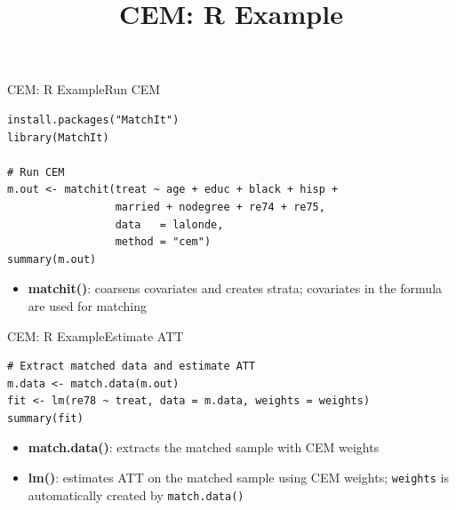 \documentclass[dvipsnames,hyperref={pdfpagelabels=false}]{beamer}
\begin{document}

\title[]
{CEM: R Example}

\author
{}

\institute{}

\date
{}

\begin{frame}{}
\titlepage
\end{frame}


\begin{frame}[fragile]{CEM: R Example}{Run CEM}
\begin{lstlisting}
install.packages("MatchIt")
library(MatchIt)

# Run CEM
m.out <- matchit(treat ~ age + educ + black + hisp +
                 married + nodegree + re74 + re75,
                 data   = lalonde,
                 method = "cem")
summary(m.out)
\end{lstlisting}
\begin{itemize}
    \item \textbf{matchit()}: coarsens covariates and creates strata;
    covariates in the formula are used for matching
\end{itemize}
\end{frame}

\begin{frame}[fragile]{CEM: R Example}{Estimate ATT}
\begin{lstlisting}
# Extract matched data and estimate ATT
m.data <- match.data(m.out)
fit <- lm(re78 ~ treat, data = m.data, weights = weights)
summary(fit)
\end{lstlisting}
\begin{itemize}
    \item \textbf{match.data()}: extracts the matched sample with
    CEM weights
    \item \textbf{lm()}: estimates ATT on the matched sample using
    CEM weights; \texttt{weights} is automatically created by
    \texttt{match.data()}
\end{itemize}
\end{frame}
\end{document}
